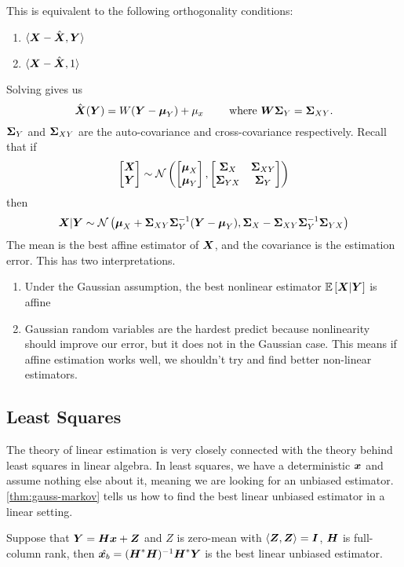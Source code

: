 This is equivalent to the following orthogonality conditions:
\begin{enumerate}
	\item $\langle \boldsymbol{X}-\hat{\boldsymbol{X}}, \boldsymbol{Y} \rangle$
	\item $\langle \boldsymbol{X}-\hat{\boldsymbol{X}}, 1 \rangle$
\end{enumerate}
Solving gives us
\[
	\hat{\boldsymbol{X}}(\boldsymbol{Y}) = W(\boldsymbol{Y}-\boldsymbol{\mu}_Y) + \mu_x \qquad \text{ where } \boldsymbol{W}\boldsymbol{\Sigma}_Y=\boldsymbol{\Sigma}_{XY}.
\]
$\boldsymbol{\Sigma}_Y$ and $\boldsymbol{\Sigma}_{XY}$ are the auto-covariance and cross-covariance respectively.
Recall that if \[
	\begin{bmatrix} \boldsymbol{X} \\ \boldsymbol{Y} \end{bmatrix} \sim \mathcal{N}\left(\begin{bmatrix} \boldsymbol{\mu}_X \\ \boldsymbol{\mu}_Y \end{bmatrix}, \begin{bmatrix} \boldsymbol{\Sigma}_X & \boldsymbol{\Sigma}_{XY}\\ \boldsymbol{\Sigma}_{YX} & \boldsymbol{\Sigma}_Y \end{bmatrix}\right)
\]
then \[
	\boldsymbol{X}|\boldsymbol{Y} \sim \mathcal{N}\left(\boldsymbol{\mu}_X + \boldsymbol{\Sigma}_{XY}\boldsymbol{\Sigma}_Y^{-1}(\boldsymbol{Y}-\boldsymbol{\mu}_Y), \boldsymbol{\Sigma}_X-\boldsymbol{\Sigma}_{XY}\boldsymbol{\Sigma}_Y^{-1}\boldsymbol{\Sigma}_{YX} \right)
\]
The mean is the best affine estimator of $\boldsymbol{X}$, and the covariance is the estimation error.
This has two interpretations.
\begin{enumerate}
	\item Under the Gaussian assumption, the best nonlinear estimator $\mathbb{E}\left[\boldsymbol{X}|\boldsymbol{Y}\right]$ is affine
	\item Gaussian random variables are the hardest predict because nonlinearity should improve our error, but it does not in the Gaussian case. This means if affine estimation works well, we shouldn't try and find better non-linear estimators.
\end{enumerate}
\subsection{Least Squares}
The theory of linear estimation is very closely connected with the theory behind least squares in linear algebra.
In least squares, we have a deterministic $\boldsymbol{x}$ and assume nothing else about it, meaning we are looking for an unbiased estimator.
\cref{thm:gauss-markov} tells us how to find the best linear unbiased estimator in a linear setting.
\begin{theorem}
		Suppose that $\boldsymbol{Y}=\boldsymbol{H}\boldsymbol{x}+\boldsymbol{Z}$ and $Z$ is zero-mean with $\langle \boldsymbol{Z}, \boldsymbol{Z} \rangle = \boldsymbol{I}$, $\boldsymbol{H}$ is full-column rank, then $\hat{\boldsymbol{x}_b} = (\boldsymbol{H}^*\boldsymbol{H})^{-1}\boldsymbol{H}^*\boldsymbol{Y}$ is the best linear unbiased estimator.
	\label{thm:gauss-markov}
\end{theorem}
